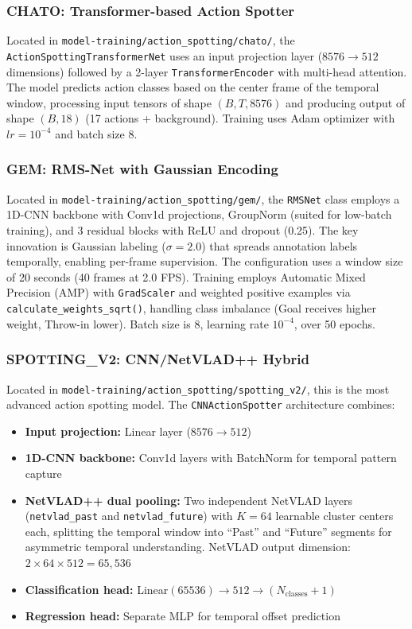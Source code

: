 \documentclass[10pt,twocolumn,a4paper]{article}
\begin{document}
\subsubsection{CHATO: Transformer-based Action Spotter}
Located in \texttt{model-training/action\_spotting/chato/}, the \texttt{ActionSpottingTransformerNet} uses an input projection layer ($8576 \rightarrow 512$ dimensions) followed by a 2-layer \texttt{TransformerEncoder} with multi-head attention. The model predicts action classes based on the center frame of the temporal window, processing input tensors of shape $(B, T, 8576)$ and producing output of shape $(B, 18)$ (17 actions + background). Training uses Adam optimizer with $lr = 10^{-4}$ and batch size 8.

\subsubsection{GEM: RMS-Net with Gaussian Encoding}
Located in \texttt{model-training/action\_spotting/gem/}, the \texttt{RMSNet} class employs a 1D-CNN backbone with Conv1d projections, GroupNorm (suited for low-batch training), and 3 residual blocks with ReLU and dropout (0.25). The key innovation is Gaussian labeling ($\sigma = 2.0$) that spreads annotation labels temporally, enabling per-frame supervision. The configuration uses a window size of 20 seconds (40 frames at 2.0 FPS). Training employs Automatic Mixed Precision (AMP) with \texttt{GradScaler} and weighted positive examples via \texttt{calculate\_weights\_sqrt()}, handling class imbalance (Goal receives higher weight, Throw-in lower). Batch size is 8, learning rate $10^{-4}$, over 50 epochs.

\subsubsection{SPOTTING\_V2: CNN/NetVLAD++ Hybrid}
Located in \texttt{model-training/action\_spotting/spotting\_v2/}, this is the most advanced action spotting model. The \texttt{CNNActionSpotter} architecture combines:

\begin{itemize}[noitemsep,topsep=0pt]
  \item \textbf{Input projection:} Linear layer ($8576 \rightarrow 512$)
  \item \textbf{1D-CNN backbone:} Conv1d layers with BatchNorm for temporal pattern capture
  \item \textbf{NetVLAD++ dual pooling:} Two independent NetVLAD layers (\texttt{netvlad\_past} and \texttt{netvlad\_future}) with $K=64$ learnable cluster centers each, splitting the temporal window into ``Past'' and ``Future'' segments for asymmetric temporal understanding. NetVLAD output dimension: $2 \times 64 \times 512 = 65{,}536$
  \item \textbf{Classification head:} Linear$(65536) \rightarrow 512 \rightarrow (N_{\text{classes}} + 1)$
  \item \textbf{Regression head:} Separate MLP for temporal offset prediction
\end{itemize}
\end{document}
